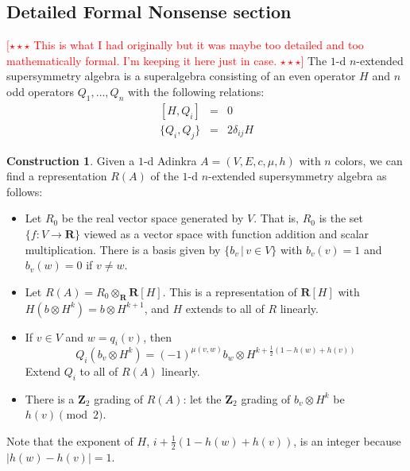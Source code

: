 \documentclass[12pt,twoside,singlespace]{article}
\numberwithin{equation}{section}
\theoremstyle{definition}
\newtheorem{construction}[equation]{Construction}
\newcommand{\ZZ}{\mathbf{Z}}
\newcommand{\RR}{\mathbf{R}}
\newcommand{\com}[1]{\textcolor{red}{$[\star \star \star$ #1 $\star \star \star]$}}
\begin{document}
\subsection{Detailed Formal Nonsense section}
\com{This is what I had originally but it was maybe too detailed and too mathematically formal.  I'm keeping it here just in case.}
\label{app:repn}
The $1$-d $n$-extended supersymmetry algebra is a superalgebra consisting of an even operator $H$ and $n$ odd operators $Q_1, \ldots, Q_n$ with the following relations:
\begin{eqnarray}
\label{eqn:susy1d1}
[H,Q_i]&=&0\\
\label{eqn:susy1d2}
\{Q_i,Q_j\}&=&2\delta_{ij}H
\end{eqnarray}

\begin{construction}
\label{cons:susy1d}
Given a $1$-d Adinkra $A=(V,E,c,\mu,h)$ with $n$ colors, we can find a representation $R(A)$ of the $1$-d $n$-extended supersymmetry algebra as follows:
\begin{itemize}
\item Let $R_0$ be the real vector space generated by $V$.  That is, $R_0$ is the set $\{f:V\to \RR\}$ viewed as a vector space with function addition and scalar multiplication.  There is a basis given by $\{b_v\,|\,v\in V\}$ with $b_v(v)=1$ and $b_v(w)=0$ if $v\not=w$.
\item Let $R(A)=R_0\otimes_\RR \RR[H]$.  This is a representation of $\RR[H]$ with $H(b\otimes H^k)=b\otimes H^{k+1}$, and $H$ extends to all of $R$ linearly.
\item If $v\in V$ and $w=q_i(v)$, then
\[Q_i(b_v\otimes H^k)=(-1)^{\mu(v,w)} b_w\otimes H^{k+\frac12(1-h(w)+h(v))}\]
Extend $Q_i$ to all of $R(A)$ linearly.
\item There is a $\ZZ_2$ grading of $R(A)$: let the $\ZZ_2$ grading of $b_v\otimes H^k$ be $h(v)\pmod{2}$.
\end{itemize}
\end{construction}
Note that the exponent of $H$, $i+\frac12(1-h(w)+h(v))$, is an integer because $|h(w)-h(v)|=1$.
\end{document}
